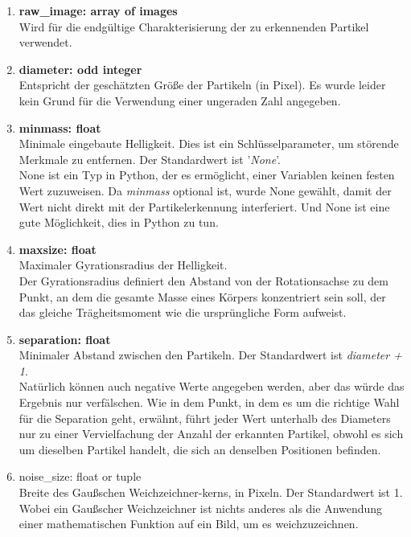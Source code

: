 		\begin{enumerate}
    			\item \textbf{raw\_image: array of images} \\
    			Wird für die endgültige Charakterisierung der zu erkennenden Partikel verwendet.
    			
    			\item \textbf{diameter: odd integer} \\
    			Entspricht der geschätzten Größe der Partikeln (in Pixel). Es wurde leider kein Grund für die Verwendung einer ungeraden Zahl angegeben.
    			\item \textbf{minmass: float} \\
    			Minimale eingebaute Helligkeit. Dies ist ein Schlüsselparameter, um störende 				Merkmale zu entfernen. Der Standardwert ist '\textit{None}'.\\
    			\label{none}None ist ein Typ in Python, der es ermöglicht, einer Variablen keinen festen Wert zuzuweisen. Da \textit{minmass} optional ist, wurde None gewählt, damit der Wert nicht direkt mit der Partikelerkennung interferiert. Und None ist eine gute Möglichkeit, dies in Python zu tun.
    			
    			\item \textbf{maxsize: float}\\
    			Maximaler Gyrationsradius der Helligkeit.\\
    			Der Gyrationsradius \cite{raduis_of_gyration} definiert den Abstand von der Rotationsachse zu dem Punkt, an dem die gesamte Masse eines Körpers konzentriert sein soll, der das gleiche Trägheitsmoment wie die ursprüngliche Form aufweist.    			
    			
    			\item \textbf{separation: float}\\
    			Minimaler Abstand zwischen den Partikeln. Der Standardwert ist \textit{diameter + 1}.\\
    			Natürlich können auch negative Werte angegeben werden, aber das würde das Ergebnis nur verfälschen. Wie in dem Punkt, in dem es um die richtige Wahl für die Separation geht, erwähnt, führt jeder Wert unterhalb des Diameters nur zu einer Vervielfachung der Anzahl der erkannten Partikel, obwohl es sich um dieselben Partikel handelt, die sich an denselben Positionen befinden.			
    			
    			\item noise\_size: float or tuple\\
    			Breite des Gaußschen Weichzeichner-kerns, in Pixeln. Der Standardwert ist 1.\\
    			Wobei  ein Gaußscher Weichzeichner ist nichts anderes als die Anwendung einer mathematischen Funktion auf ein Bild, um es weichzuzeichnen.
    			

\end{enumerate}
